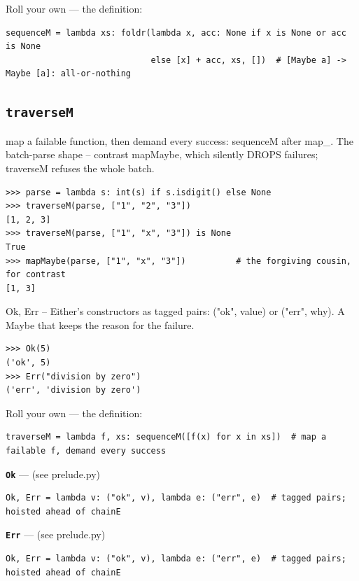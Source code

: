 \documentclass[10pt,letterpaper]{book}
\begin{document}
Roll your own --- the definition:

\begin{lstlisting}[style=ex]
sequenceM = lambda xs: foldr(lambda x, acc: None if x is None or acc is None
                             else [x] + acc, xs, [])  # [Maybe a] -> Maybe [a]: all-or-nothing
\end{lstlisting}
\subsection{\texttt{traverseM}}\label{def:traverseM}
map a failable function, then demand every success: sequenceM after map\_. The batch-parse shape -- contrast mapMaybe, which silently DROPS failures; traverseM refuses the whole batch.
\begin{lstlisting}[style=ex]
>>> parse = lambda s: int(s) if s.isdigit() else None
>>> traverseM(parse, ["1", "2", "3"])
[1, 2, 3]
>>> traverseM(parse, ["1", "x", "3"]) is None
True
>>> mapMaybe(parse, ["1", "x", "3"])          # the forgiving cousin, for contrast
[1, 3]
\end{lstlisting}

Ok, Err -- Either's constructors as tagged pairs: ("ok", value) or ("err", why). A Maybe that keeps the reason for the failure.

\begin{lstlisting}[style=ex]
>>> Ok(5)
('ok', 5)
>>> Err("division by zero")
('err', 'division by zero')
\end{lstlisting}

Roll your own --- the definition:

\begin{lstlisting}[style=ex]
traverseM = lambda f, xs: sequenceM([f(x) for x in xs])  # map a failable f, demand every success
\end{lstlisting}

\textbf{\texttt{Ok}}\label{def:Ok} --- (see prelude.py)

\begin{lstlisting}[style=ex]
Ok, Err = lambda v: ("ok", v), lambda e: ("err", e)  # tagged pairs; hoisted ahead of chainE
\end{lstlisting}
\textbf{\texttt{Err}}\label{def:Err} --- (see prelude.py)

\begin{lstlisting}[style=ex]
Ok, Err = lambda v: ("ok", v), lambda e: ("err", e)  # tagged pairs; hoisted ahead of chainE
\end{lstlisting}
\end{document}
